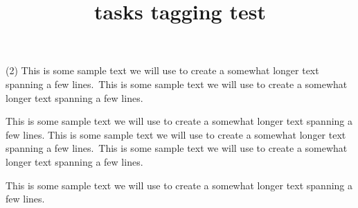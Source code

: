 \documentclass{article}
\title{tasks tagging test}
\def\sample{This is some sample text we will use to create a somewhat
longer text spanning a few lines.}
\def\Sample{\sample\ \sample\par\sample}
\begin{document}
\begin{tasks}(2)
\task \Sample
\task \Sample
\end{tasks}
\end{document}
